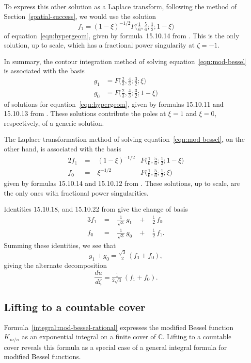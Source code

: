 \documentclass{article}
\theoremstyle{plain}
\newcommand{\C}{\mathbb{C}}
\begin{document}
To express this other solution as a Laplace transform, following the method of Section~\ref{spatial-success}, we would use the solution
\[ f_1 = (1-\xi)^{-1/2} F\big(\tfrac{1}{6}, \tfrac{5}{6}; \tfrac{1}{2}; 1-\xi\big) \]
of equation~\ref{eqn:hypergeom}, given by formula~15.10.14 from \cite{dlmf}. This is the only solution, up to scale, which has a fractional power singularity at $\zeta = -1$.

In summary, the contour integration method of solving equation~\ref{eqn:mod-bessel} is associated with the basis
\begin{align*}
g_1 & = F\big(\tfrac{2}{3}, \tfrac{4}{3}; \tfrac{3}{2}; \xi\big) \\
g_0 & = F\big(\tfrac{2}{3}, \tfrac{4}{3}; \tfrac{3}{2}; 1-\xi\big)
\end{align*}
of solutions for equation~\ref{eqn:hypergeom}, given by formulas 15.10.11 and 15.10.13 from \cite{dlmf}. These solutions contribute the poles at $\xi = 1$ and $\xi = 0$, respectively, of a generic solution.

The Laplace transformation method of solving equation~\ref{eqn:mod-bessel}, on the other hand, is associated with the basis
\begin{alignat*}{2}
f_1 &\;=\;& (1-\xi)^{-1/2} & F\big(\tfrac{1}{6}, \tfrac{5}{6}; \tfrac{1}{2}; 1-\xi\big) \\
f_0 &\;=\:& \xi^{-1/2} & F\big(\tfrac{1}{6}, \tfrac{5}{6}; \tfrac{1}{2}; \xi\big)
\end{alignat*}
given by formulas 15.10.14 and 15.10.12 from \cite{dlmf}. These solutions, up to scale, are the only ones with fractional power singularities.

Identities 15.10.18, and 15.10.22 from \cite{dlmf} give the change of basis
\begin{alignat*}{3}
f_1 &\;=\;&\tfrac{1}{\sqrt{3}}\,g_1 &\;+\;& \tfrac{1}{2}\,f_0 \\
f_0 &\;=\;& \tfrac{1}{\sqrt{3}}\,g_0 &\;+\;& \tfrac{1}{2}\,f_1.
\end{alignat*}
Summing these identities, we see that
\[ g_1 + g_0 = \tfrac{\sqrt{3}}{2}\,(f_1 + f_0), \]
giving the alternate decomposition
\[ \frac{du}{d\zeta} = \tfrac{1}{2\sqrt{3}}\,(f_1 + f_0). \]
\subsection{Lifting to a countable cover}
Formula~\ref{integral:mod-bessel-rational} expresses the modified Bessel function $K_{m/n}$ as an exponential integral on a finite cover of $\C$. Lifting to a countable cover reveals this formula as a special case of a general integral formula for modified Bessel functions.
\end{document}
